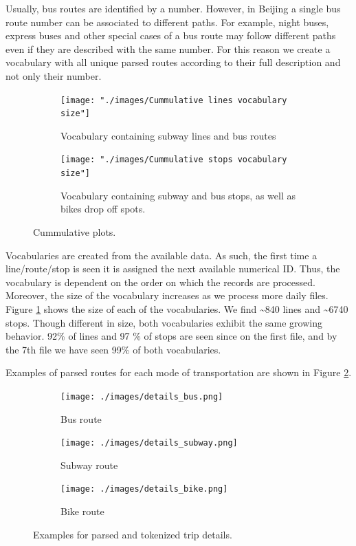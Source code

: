 \documentclass{article}
\begin{document}
Usually, bus routes are identified by a number. However, in Beijing a single bus route number can be associated to different paths. For example, night buses, express buses and other special cases of a bus route may follow different paths even if they are described with the same number. For this reason we create a vocabulary with all unique parsed routes according to their full description and not only their number.  

\begin{figure}[H]
  \centering
  \begin{subfigure}[b]{.7\textwidth}
  	\centering
  	\texttt{[image: "./images/Cummulative lines vocabulary size"]}
  	\caption{Vocabulary containing subway lines and bus routes}
  \end{subfigure}
  \begin{subfigure}[b]{.7\textwidth}
  	\centering
  	\texttt{[image: "./images/Cummulative stops vocabulary size"]}
  	\caption{Vocabulary containing subway and bus stops, as well as bikes drop off spots.}
  \end{subfigure}
  \caption{Cummulative plots.}
  \label{fig:preprocessing/cummulativeVoc}
\end{figure}

Vocabularies are created from the available data. As such, the first time a line/route/stop is seen it is assigned the next available numerical ID. Thus, the vocabulary is dependent on the order on which the records are processed. Moreover, the size of the vocabulary increases as we process more daily files. Figure \ref{fig:preprocessing/cummulativeVoc} shows the size of each of the vocabularies. We find  \textasciitilde 840 lines and \textasciitilde 6740 stops. Though different in size, both vocabularies exhibit the same growing behavior. 92\% of lines and 97 \% of stops are seen since on the first file, and by the 7th file we have seen 99\% of both vocabularies.

Examples of parsed routes for each mode of transportation are shown in Figure \ref{fig:preprocessing/parsed_routes}. 

\begin{figure}[H]
  \centering
  \begin{subfigure}[b]{\textwidth}
  	\centering
  	\texttt{[image: ./images/details\_bus.png]}
  	\caption{Bus route}
  \end{subfigure}
  \begin{subfigure}[b]{.75\textwidth}
  	\centering
  	\texttt{[image: ./images/details\_subway.png]}
  	\caption{Subway route}
  \end{subfigure}
    \begin{subfigure}[b]{.7\textwidth}
  	\centering
  	\texttt{[image: ./images/details\_bike.png]}
  	\caption{Bike route}
  \end{subfigure}
  \caption{Examples for parsed and tokenized trip details.}
  	\label{fig:preprocessing/parsed_routes}
\end{figure}
\end{document}
